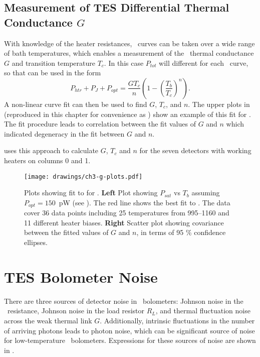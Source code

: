 \subsection{Measurement of \textsc{TES} Differential Thermal Conductance $G$}

With knowledge of the heater resistances, \IV\ curves can be taken over a wide range of bath temperatures, which enables a measurement of the \TES\ thermal conductance $G$ and transition temperature $T_c$.
In this case $P_{tot}$ will different for each \IV\ curve, so that  can be used in the form
\begin{equation}\label{eqn:ch3-g-fit}
P_{htr} + P_J + P_{opt}= \frac{G T_c}{n}\left(1 - \left(\frac{T_b}{T_c}\right)^n\right).
\end{equation}
A non-linear curve fit can then be used to find $G$, $T_c$, and $n$.
The upper plots in  (reproduced in this chapter for convenience as ) show an example of this fit for .
The fit procedure leads to correlation between the fit values of $G$ and $n$ which indicated degeneracy in the fit between $G$ and $n$.

 uses this approach to calculate $G$, $T_c$ and $n$ for the seven detectors with working heaters on columns 0 and 1.

\begin{figure*}
\texttt{[image: drawings/ch3-g-plots.pdf]}
\caption[Plots showing fit to ]{
Plots showing fit to  for .
\textbf{Left} Plot showing $P_{sat}$ vs $T_b$ assuming $P_{opt} = 150$~pW (see ).
The red line shows the best fit to .
The data cover 36 data points including 25 temperatures from \SIrange{995}{1160}{\mK} and 11 different heater biases.
\textbf{Right} Scatter plot showing covariance between the fitted values of $G$ and $n$, in terms of 95 \% confidence ellipses.} 
\label{fig:ch3-g-plots}
\end{figure*}

\section{\textsc{TES} Bolometer Noise} \label{sec:ch3-tes-noise}

There are three sources of detector noise in \TES\ bolometers: Johnson noise in the \TES\ resistance, Johnson noise in the load resistor $R_L$, and thermal fluctuation noise across the weak thermal link $G$.
Additionally, intrinsic fluctuations in the number of arriving photons leads to photon noise, which can be significant source of noise for low-temperature \TES\ bolometers.
Expressions for these sources of noise are shown in .

